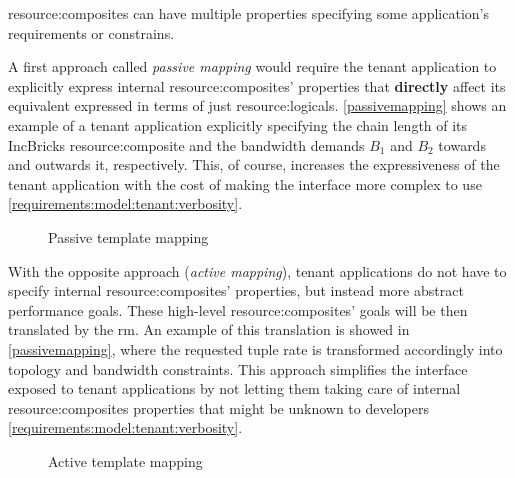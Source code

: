 \Glspl{resource:composite} can have multiple properties specifying some application's requirements or constrains.

A first approach called \textit{passive mapping} would require the tenant application to explicitly express internal \glspl{resource:composite}' properties that \textbf{directly} affect its equivalent expressed in terms of just \glspl{resource:logical}.
\autoref{passivemapping} shows an example of a tenant application explicitly specifying the chain length of its IncBricks \cite{incbricks} \gls{resource:composite} and the bandwidth demands $B_1$ and $B_2$ towards and outwards it, respectively.
This, of course, increases the expressiveness of the tenant application with the cost of making the interface more complex to use \xmark \ref{requirements:model:tenant:verbosity}.

\begin{figure}[!htb]
    \centering
    \usebox{\passivemapping}
    \caption{Passive template mapping}
    \label{passivemapping}
\end{figure}

With the opposite approach (\textit{active mapping}), tenant applications do not have to specify internal \glspl{resource:composite}' properties, but instead more abstract performance goals.
These high-level \glspl{resource:composite}' goals will be then translated by the \gls{rm}.
An example of this translation is showed in \autoref{passivemapping}, where the requested tuple rate is transformed accordingly into topology and bandwidth constraints.
This approach simplifies the interface exposed to tenant applications by not letting them taking care of internal \glspl{resource:composite} properties that might be unknown to developers \cmark \ref{requirements:model:tenant:verbosity}.

\begin{figure}[!htb]
    \centering
    \usebox{\activemapping}
    \caption{Active template mapping}
    \label{activemapping}
\end{figure}